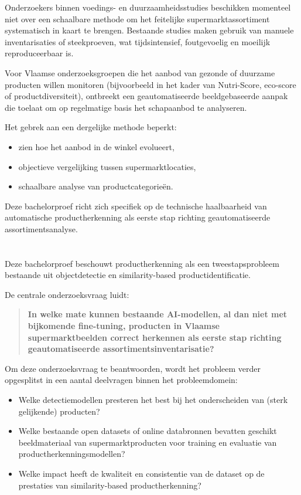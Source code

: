 Onderzoekers binnen voedings- en duurzaamheidsstudies beschikken momenteel niet over een schaalbare methode om het feitelijke supermarktassortiment systematisch in kaart te brengen. Bestaande studies maken gebruik van manuele inventarisaties of steekproeven, wat tijdsintensief, foutgevoelig en moeilijk reproduceerbaar is. 

Voor Vlaamse onderzoeksgroepen die het aanbod van gezonde of duurzame producten willen monitoren (bijvoorbeeld in het kader van Nutri-Score, eco-score of productdiversiteit), ontbreekt een geautomatiseerde beeldgebaseerde aanpak die toelaat om op regelmatige basis het schapaanbod te analyseren.

Het gebrek aan een dergelijke methode beperkt:
\begin{itemize}
    \item zien hoe het aanbod in de winkel evolueert,
    \item objectieve vergelijking tussen supermarktlocaties,
    \item schaalbare analyse van productcategorieën.
\end{itemize}

Deze bachelorproef richt zich specifiek op de technische haalbaarheid van automatische productherkenning als eerste stap richting geautomatiseerde assortimentsanalyse.

\section{}%
\label{sec:onderzoeksvraag}

Deze bachelorproef beschouwt productherkenning als een tweestapsprobleem bestaande uit objectdetectie en similarity-based productidentificatie.

De centrale onderzoeksvraag luidt:

\begin{quote}
\textbf{In welke mate kunnen bestaande AI-modellen, al dan niet met bijkomende fine-tuning, producten in Vlaamse supermarktbeelden correct herkennen als eerste stap richting geautomatiseerde assortimentsinventarisatie?}
\end{quote}

Om deze onderzoeksvraag te beantwoorden, wordt het probleem verder opgesplitst in een aantal deelvragen binnen het probleemdomein:

\begin{itemize}
    \item Welke detectiemodellen presteren het best bij het onderscheiden van (sterk gelijkende) producten?
    \item Welke bestaande open datasets of online databronnen bevatten geschikt beeldmateriaal van supermarktproducten voor training en evaluatie van productherkenningsmodellen?
    \item Welke impact heeft de kwaliteit en consistentie van de dataset op de prestaties van similarity-based productherkenning?
\end{itemize}

